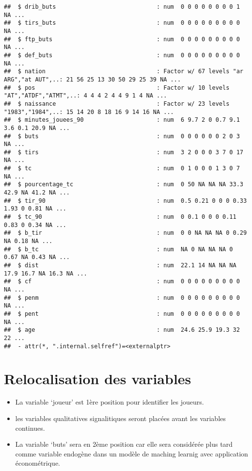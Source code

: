 \documentclass[7pt,]{report}
\begin{document}
\begin{verbatim}
##  $ drib_buts                             : num  0 0 0 0 0 0 0 0 1 NA ...
##  $ tirs_buts                             : num  0 0 0 0 0 0 0 0 0 NA ...
##  $ ftp_buts                              : num  0 0 0 0 0 0 0 0 0 NA ...
##  $ def_buts                              : num  0 0 0 0 0 0 0 0 0 NA ...
##  $ nation                                : Factor w/ 67 levels "ar ARG","at AUT",..: 21 56 25 13 30 50 29 25 39 NA ...
##  $ pos                                   : Factor w/ 10 levels "AT","ATDF","ATMT",..: 4 4 4 2 4 4 9 1 4 NA ...
##  $ naissance                             : Factor w/ 23 levels "1983","1984",..: 15 14 20 8 18 16 9 14 16 NA ...
##  $ minutes_jouees_90                     : num  6 9.7 2 0 0.7 9.1 3.6 0.1 20.9 NA ...
##  $ buts                                  : num  0 0 0 0 0 0 2 0 3 NA ...
##  $ tirs                                  : num  3 2 0 0 0 3 7 0 17 NA ...
##  $ tc                                    : num  0 1 0 0 0 1 3 0 7 NA ...
##  $ pourcentage_tc                        : num  0 50 NA NA NA 33.3 42.9 NA 41.2 NA ...
##  $ tir_90                                : num  0.5 0.21 0 0 0 0.33 1.93 0 0.81 NA ...
##  $ tc_90                                 : num  0 0.1 0 0 0 0.11 0.83 0 0.34 NA ...
##  $ b_tir                                 : num  0 0 NA NA NA 0 0.29 NA 0.18 NA ...
##  $ b_tc                                  : num  NA 0 NA NA NA 0 0.67 NA 0.43 NA ...
##  $ dist                                  : num  22.1 14 NA NA NA 17.9 16.7 NA 16.3 NA ...
##  $ cf                                    : num  0 0 0 0 0 0 0 0 0 NA ...
##  $ penm                                  : num  0 0 0 0 0 0 0 0 0 NA ...
##  $ pent                                  : num  0 0 0 0 0 0 0 0 0 NA ...
##  $ age                                   : num  24.6 25.9 19.3 32 22 ...
##  - attr(*, ".internal.selfref")=<externalptr>
\end{verbatim}

\hypertarget{relocalisation-des-variables}{%
\section{Relocalisation des variables}\label{relocalisation-des-variables}}

\begin{itemize}
\item
  La variable `joueur' est 1ère position pour identifier les joueurs.
\item
  les variables qualitatives signalitiques seront placées avant les variables continues.
\item
  La variable `buts' sera en 2ème position car elle sera considérée plus tard comme variable endogène dans un modèle de maching learnig avec application économétrique.
\end{itemize}
\end{document}
